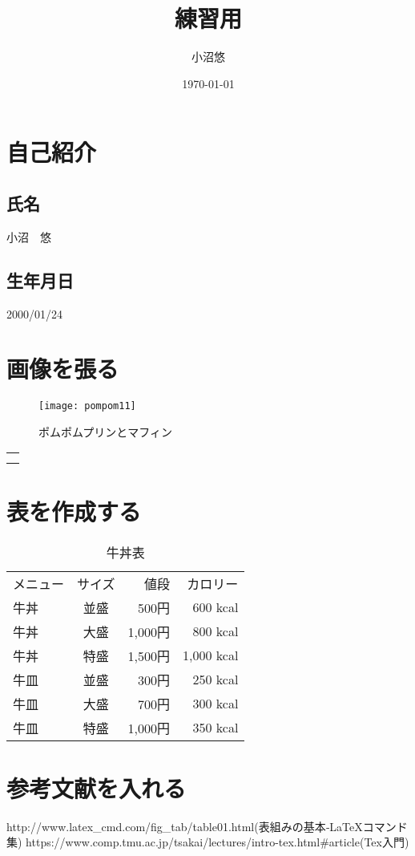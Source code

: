 \documentclass{jarticle}
\title{練習用}
\author{小沼悠}
\date{\today}
\begin{document}
  \maketitle

\section{自己紹介}
\subsection{氏名}
小沼　悠\cite{2}
\subsection{生年月日}
2000/01/24\cite{2}
\section{画像を張る}
\begin{figure}[htbp]
\begin{center}
\texttt{[image: pompom11]}
\caption{ポムポムプリンとマフィン}
\end{center}
\end{figure}
\cite{2}
\begin{tabular}{l}
\\
\\
\\
\end{tabular}
\section {表を作成する}
\begin{table}[h]
\begin{flushleft}
  \begin{tabular}{|l|c|r|r|}
    メニュー & サイズ & 値段 & カロリー \\
    牛丼 & 並盛 & 500円 & 600 kcal \\
    牛丼 & 大盛 & 1,000円 & 800 kcal \\
    牛丼 & 特盛 & 1,500円 & 1,000 kcal \\
    牛皿 & 並盛 & 300円 & 250 kcal \\
    牛皿 & 大盛 & 700円 & 300 kcal \\
    牛皿 & 特盛 & 1,000円 & 350 kcal\\
  \end{tabular}
\caption{牛丼表}
\cite{1}
\end{flushleft}
\end{table}

\section {参考文献を入れる}
\begin{thebibliography}{9}
http://www.latex\_cmd.com/fig\_tab/table01.html(表組みの基本‐LaTeXコマンド集)
https://www.comp.tmu.ac.jp/tsakai/lectures/intro-tex.html\#article(Tex入門)
\end{thebibliography}
\end{document}

